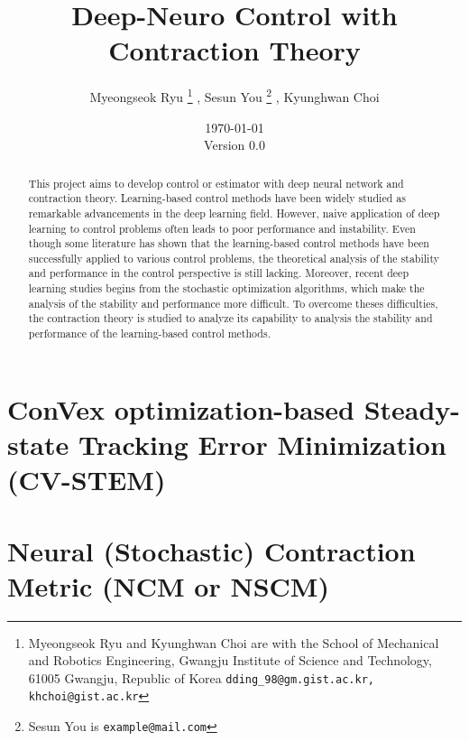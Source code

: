 \documentclass{article}
\title{
    Deep-Neuro Control with Contraction Theory
}
\author{
    Myeongseok Ryu
    \thanks{Myeongseok Ryu and Kyunghwan Choi are with the School of Mechanical and Robotics Engineering, Gwangju Institute of Science and Technology, 61005 Gwangju, Republic of Korea {\tt\small dding\_98@gm.gist.ac.kr, khchoi@gist.ac.kr}}%
    ,
    Sesun You
    \thanks{Sesun You is 
        {\tt\small example@mail.com}}%
    ,
    Kyunghwan Choi
    \footnotemark[1]
}
\date{
    \today
    \\
    Version 0.0
}
\begin{document}
\maketitle

\begin{abstract}
    This project aims to develop control or estimator with deep neural network and contraction theory.
    Learning-based control methods have been widely studied as remarkable advancements in the deep learning field.
    However, naive application of deep learning to control problems often leads to poor performance and instability.
    Even though some literature has shown that the learning-based control methods have been successfully applied to various control problems, the theoretical analysis of the stability and performance in the control perspective is still lacking.
    Moreover, recent deep learning studies begins from the stochastic optimization algorithms, which make the analysis of the stability and performance more difficult.
    To overcome theses difficulties, the contraction theory is studied to analyze its capability to analysis the stability and performance of the learning-based control methods.
\end{abstract}

\tableofcontents







\section{ConVex optimization-based Steady-state Tracking Error Minimization (CV-STEM)}

\section{Neural (Stochastic) Contraction Metric (NCM or NSCM)}
\end{document}
